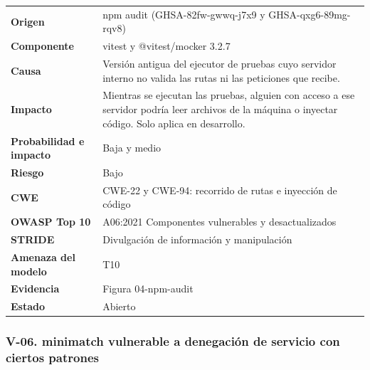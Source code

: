 \documentclass[12pt, letterpaper]{article}
\begin{document}
\begingroup\small\setlength{\tabcolsep}{4pt}\renewcommand{\arraystretch}{1.25}
\begin{longtable}{L{0.24}L{0.70}}
\toprule
\endfirsthead
\toprule
\endhead
\bottomrule
\endfoot
\textbf{Origen} & npm audit (GHSA-82fw-gwwq-j7x9 y GHSA-qxg6-89mg-rqv8) \\
\textbf{Componente} & vitest y @vitest/mocker 3.2.7 \\
\textbf{Causa} & Versión antigua del ejecutor de pruebas cuyo servidor interno no valida las rutas ni las peticiones que recibe. \\
\textbf{Impacto} & Mientras se ejecutan las pruebas, alguien con acceso a ese servidor podría leer archivos de la máquina o inyectar código. Solo aplica en desarrollo. \\
\textbf{Probabilidad e impacto} & Baja y medio \\
\textbf{Riesgo} & Bajo \\
\textbf{CWE} & CWE-22 y CWE-94: recorrido de rutas e inyección de código \\
\textbf{OWASP Top 10} & A06:2021 Componentes vulnerables y desactualizados \\
\textbf{STRIDE} & Divulgación de información y manipulación \\
\textbf{Amenaza del modelo} & T10 \\
\textbf{Evidencia} & Figura 04-npm-audit \\
\textbf{Estado} & Abierto \\
\end{longtable}
\endgroup

\subsubsection*{V-06. minimatch vulnerable a denegación de servicio con ciertos patrones}
\end{document}
